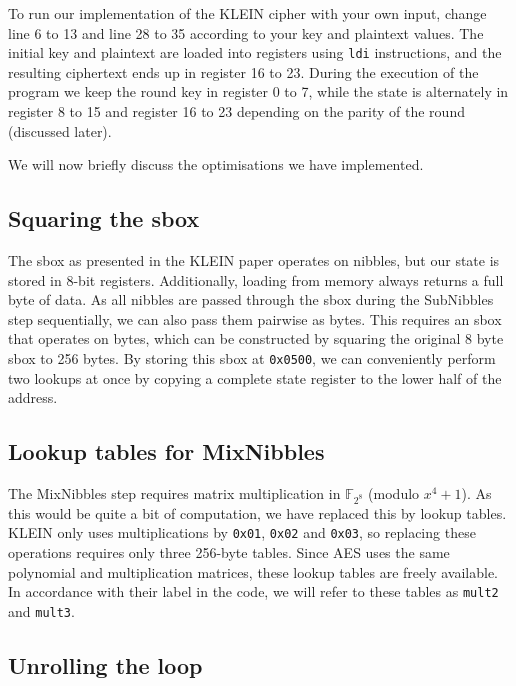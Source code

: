 \documentclass[a4paper]{article}
\begin{document}
To run our implementation of the KLEIN cipher with your own input, change line 6 to 13 and line 28 to 35 according to your key and plaintext values. The initial key and plaintext are loaded into registers using \texttt{ldi} instructions, and the resulting ciphertext ends up in register 16 to 23. During the execution of the program we keep the round key in register 0 to 7, while the state is alternately in register 8 to 15 and register 16 to 23 depending on the parity of the round (discussed later).

We will now briefly discuss the optimisations we have implemented.


\subsection*{Squaring the sbox}

The sbox as presented in the KLEIN paper operates on nibbles, but our state is stored in 8-bit registers. Additionally, loading from memory always returns a full byte of data. As all nibbles are passed through the sbox during the SubNibbles step sequentially, we can also pass them pairwise as bytes. This requires an sbox that operates on bytes, which can be constructed by squaring the original 8 byte sbox to 256 bytes. By storing this sbox at \texttt{0x0500}, we can conveniently perform two lookups at once by copying a complete state register to the lower half of the address.

\subsection*{Lookup tables for MixNibbles}

The MixNibbles step requires matrix multiplication in $\mathbb{F}_{2^8}$ (modulo $x^4 + 1$). As this would be quite a bit of computation, we have replaced this by lookup tables. KLEIN only uses multiplications by \texttt{0x01}, \texttt{0x02} and \texttt{0x03}, so replacing these operations requires only three 256-byte tables. Since AES uses the same polynomial and multiplication matrices, these lookup tables are freely available. In accordance with their label in the code, we will refer to these tables as \texttt{mult2} and \texttt{mult3}.

\subsection*{Unrolling the loop}
\end{document}
